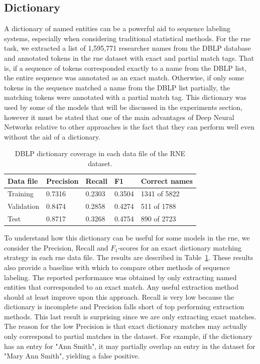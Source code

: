 \documentclass{nle}
\begin{document}
\subsection{Dictionary}
\label{sec:dictionary}

A dictionary of named entities can be a powerful aid to sequence labeling systems,
especially when considering traditional statistical methods. For the \gls{rne} task, we extracted 
a list of 1,595,771 researcher names from the DBLP database and annotated tokens in the
\gls{rne} dataset with exact and partial match tags. That is, if a sequence of tokens
corresponded exactly to a name from the DBLP list, the entire sequence was annotated as 
an exact match. Otherwise, if only some tokens in the sequence matched a name from the DBLP
list partially, the matching tokens were annotated with a partial match tag. This dictionary
was used by some of the models that will be discussed in the experiments section, however it 
must be stated that one of the main advantages of Deep Neural Networks relative to other
approaches is the fact that they can perform well even without the aid of a dictionary.

\begin{table}[h]
  \small
  \begin{center}
    \begin{tabular}{ lllll }
      \toprule
      Data file & Precision & Recall & F1 & Correct names \\
      \midrule
      Training   & 0.7316 & 0.2303 & 0.3504 & 1341 of 5822 \\ 
      Validation & 0.8474 & 0.2858 & 0.4274 & 511 of 1788 \\ 
      Test       & 0.8717 & 0.3268 & 0.4754 & 890 of 2723 \\ 
      \bottomrule
    \end{tabular}
  \end{center}
  \caption{DBLP dictionary coverage in each data file of the RNE dataset.}
  \label{tab:gazetteer}
\end{table}

To understand how this dictionary can be useful for some models in the \gls{rne}, 
we consider the Precision, Recall and $ F_1 $-scores for an exact dictionary matching 
strategy in each \gls{rne} data file. The results are described in 
Table~\ref{tab:gazetteer}. These results also provide a baseline with which to compare
other methods of sequence labeling. 
The reported performance was obtained by only extracting named entities that corresponded to an exact 
match. Any useful extraction method should at least improve upon this approach.
Recall is very low because the dictionary is incomplete and Precision falls short of
top performing extraction methods. This last result is surprising since we are only extracting 
exact matches. The reason for the low Precision is that exact dictionary matches may actually 
only correspond to partial matches in the dataset. For example, if the dictionary has an entry
for "Ann Smith", it may partially overlap an entry in the dataset for "Mary Ann Smith", yielding
a false positive.
\end{document}
